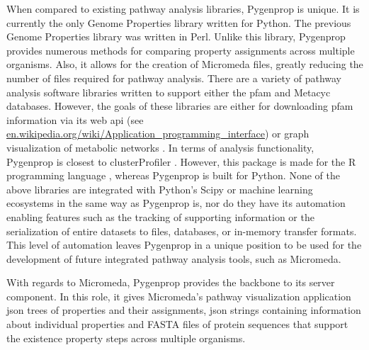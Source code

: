 When compared to existing pathway analysis libraries, Pygenprop is unique. It is currently the only Genome Properties library written for Python. The previous Genome Properties library was written in Perl. Unlike this library, Pygenprop provides numerous methods for comparing property assignments across multiple organisms. Also, it allows for the creation of Micromeda files, greatly reducing the number of files required for pathway analysis. There are a variety of pathway analysis software libraries written to support either the \gls{pfam} \cite{zhang2009kegggraph,posma2013metabonetworks,yu2012clusterprofiler,cock2009biopython} and Metacyc \cite{international} databases. However, the goals of these libraries are either for downloading \gls{pfam} information via its web \gls{api} \cite{cock2009biopython} (see \href{http://en.wikipedia.org/wiki/Application_programming_interface}{en.wikipedia.org/wiki/Application\_programming\_interface}) or graph visualization of metabolic networks \cite{posma2013metabonetworks}. In terms of analysis functionality, Pygenprop is closest to clusterProfiler \cite{yu2012clusterprofiler}. However, this package is made for the R programming language \cite{rprogman}, whereas Pygenprop is built for Python. None of the above libraries are integrated with Python's Scipy \cite{scipystack} or machine learning ecosystems in the same way as Pygenprop is, nor do they have its automation enabling features such as the tracking of supporting information or the serialization of entire datasets to files, databases, or in-memory transfer formats. This level of automation leaves Pygenprop in a unique position to be used for the development of future integrated pathway analysis tools, such as Micromeda.

With regards to Micromeda, Pygenprop provides the backbone to its server component. In this role, it gives Micromeda's pathway visualization application \gls{json} trees of properties and their assignments, \gls{json} strings containing information about individual properties and FASTA files of protein sequences that support the existence property steps across multiple organisms.
